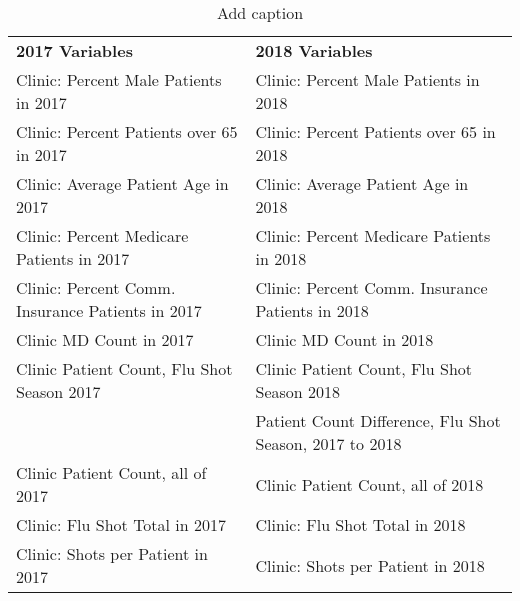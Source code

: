 \begin{table}[htbp]
  \centering
  \caption{Add caption}
    \begin{tabular}{ll}
    \textbf{2017 Variables} & \textbf{2018 Variables} \\
    Clinic: Percent Male Patients in 2017 & Clinic: Percent Male Patients in 2018 \\
    Clinic: Percent Patients over 65 in 2017 & Clinic: Percent Patients over 65 in 2018 \\
    Clinic: Average Patient Age in 2017 & Clinic: Average Patient Age in 2018 \\
    Clinic: Percent Medicare Patients in 2017 & Clinic: Percent Medicare Patients in 2018 \\
    Clinic: Percent Comm. Insurance Patients in 2017 & Clinic: Percent Comm. Insurance Patients in 2018 \\
    Clinic MD Count in 2017 & Clinic MD Count in 2018 \\
    Clinic Patient Count, Flu Shot Season 2017 & Clinic Patient Count, Flu Shot Season 2018 \\
          & Patient Count Difference, Flu Shot Season, 2017 to 2018 \\
    Clinic Patient Count, all of 2017 & Clinic Patient Count, all of 2018 \\
    Clinic: Flu Shot Total in 2017 & Clinic: Flu Shot Total in 2018 \\
    Clinic: Shots per Patient in 2017 & Clinic: Shots per Patient in 2018 \\
    \end{tabular}%
  \label{tab:addlabel}%
\end{table}%
